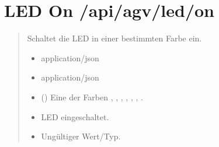 \documentclass[letterpaper,10pt,english]{sphinxmanual}
\begin{document}
\section{LED On \textendash{} /api/agv/led/on}
\label{\detokenize{agv_rest_api_led:led-on-api-agv-led-on}}\label{\detokenize{agv_rest_api_led:post-api-agv-led-on}}

\begin{fulllineitems}
\label{\detokenize{agv_rest_api_led:post--api-agv-led-on}}
\pysigstartsignatures
\pysigline
{}
\pysigstopsignatures\begin{quote}\begin{description}
\sphinxAtStartPar
Schaltet die LED in einer bestimmten Farbe ein.

\begin{itemize}
\item {} 
\sphinxAtStartPar
{} \textendash{} application/json

\end{itemize}

\begin{itemize}
\item {} 
\sphinxAtStartPar
{} \textendash{} application/json

\end{itemize}

\begin{itemize}
\item {} 
\sphinxAtStartPar
{} () \textendash{} Eine der Farben , , , , , , .

\end{itemize}

\begin{itemize}
\item {} 
\sphinxAtStartPar
{} \textendash{} LED eingeschaltet.

\item {} 
\sphinxAtStartPar
{} \textendash{} Ungültiger Wert/Typ.

\end{itemize}

\end{description}\end{quote}

\end{fulllineitems}
\end{document}

